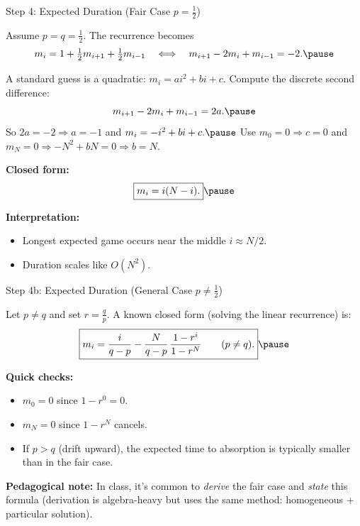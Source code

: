 \documentclass[aspectratio=169]{beamer}
\begin{document}
\begin{frame}{Step 4: Expected Duration (Fair Case $p=\tfrac12$)}

Assume $p=q=\tfrac12$. The recurrence becomes
\[
m_i = 1+\tfrac12 m_{i+1}+\tfrac12 m_{i-1}
\quad\Longleftrightarrow\quad
m_{i+1}-2m_i+m_{i-1}=-2.\pause
\vspace{-5mm}
\]

A standard guess is a quadratic: $m_i=ai^2+bi+c$.
Compute the discrete second difference:
\[
m_{i+1}-2m_i+m_{i-1} = 2a.\pause
\]
So $2a=-2 \Rightarrow a=-1$ and
$
m_i = -i^2+bi+c.\pause
$
Use $m_0=0 \Rightarrow c=0$ and $m_N=0 \Rightarrow -N^2+bN=0 \Rightarrow b=N$.

\medskip
\textbf{Closed form:}
\[
\boxed{
m_i = i(N-i).
}
\vspace{-9mm}\pause
\]

\textbf{Interpretation:}
\begin{itemize}
  \item Longest expected game occurs near the middle $i\approx N/2$.\pause
  \item Duration scales like $O(N^2)$.
\end{itemize}

\end{frame}

\begin{frame}{Step 4b: Expected Duration (General Case $p\neq \tfrac12$)}

Let $p\neq q$ and set $r=\frac{q}{p}$.\pause
\medskip
A known closed form (solving the linear recurrence) is:
\[
\boxed{
m_i
=
\frac{i}{q-p}
-
\frac{N}{q-p}\,
\frac{1-r^i}{1-r^N}
\qquad (p\neq q).
}
\vspace{-5mm}\pause
\]

\medskip
\textbf{Quick checks:}
\begin{itemize}
  \item $m_0=0$ since $1-r^0=0$.\pause
  \item $m_N=0$ since $1-r^N$ cancels.\pause
  \item If $p>q$ (drift upward), the expected time to absorption is typically smaller than in the fair case.\pause
\end{itemize}

\medskip
\textbf{Pedagogical note:}
In class, it’s common to \emph{derive} the fair case and \emph{state} this formula (derivation is algebra-heavy but uses the same method: homogeneous + particular solution).

\end{frame}
\end{document}
